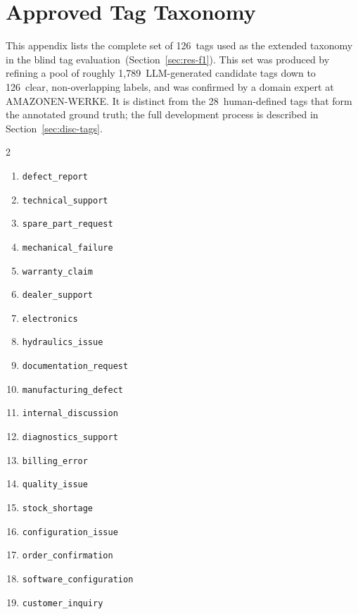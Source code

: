 \chapter{Approved Tag Taxonomy}
\label{chap:TagTaxonomy}
%
This appendix lists the complete set of 126~tags used as the extended
taxonomy in the blind tag evaluation~(Section~\ref{sec:res-f1}).  This set was
produced by refining a pool of roughly 1{,}789~LLM-generated candidate tags
down to 126~clear, non-overlapping labels, and was confirmed by a domain expert
at AMAZONEN-WERKE.  It is distinct from the 28~human-defined tags that form the
annotated ground truth; the full development process is described in
Section~\ref{sec:disc-tags}.

\begin{multicols}{2}
\footnotesize
\begin{enumerate}\itemsep2pt\parskip0pt
    \item \texttt{defect\_\allowbreak report}
    \item \texttt{technical\_\allowbreak support}
    \item \texttt{spare\_\allowbreak part\_\allowbreak request}
    \item \texttt{mechanical\_\allowbreak failure}
    \item \texttt{warranty\_\allowbreak claim}
    \item \texttt{dealer\_\allowbreak support}
    \item \texttt{electronics}
    \item \texttt{hydraulics\_\allowbreak issue}
    \item \texttt{documentation\_\allowbreak request}
    \item \texttt{manufacturing\_\allowbreak defect}
    \item \texttt{internal\_\allowbreak discussion}
    \item \texttt{diagnostics\_\allowbreak support}
    \item \texttt{billing\_\allowbreak error}
    \item \texttt{quality\_\allowbreak issue}
    \item \texttt{stock\_\allowbreak shortage}
    \item \texttt{configuration\_\allowbreak issue}
    \item \texttt{order\_\allowbreak confirmation}
    \item \texttt{software\_\allowbreak configuration}
    \item \texttt{customer\_\allowbreak inquiry}

\end{enumerate}
\end{multicols}

